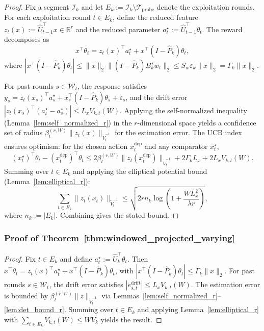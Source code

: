\documentclass{article}
\newcommand{\R}{\mathbb{R}}
\newcommand{\cI}{\mathcal{I}}
\newcommand{\cTprobe}{\mathcal{T}_{\mathrm{probe}}}
\begin{document}
\begin{proof}
Fix a segment $\cI_k$ and let $E_k := \cI_k \setminus \cTprobe$ denote the exploitation rounds.
For each exploitation round $t \in E_k$, define the reduced feature $z_t(x) := \widehat U_{t-1}^\top x \in \R^r$ and the reduced parameter $a_t^\star := \widehat U_{t-1}^\top \theta_t$.
The reward decomposes as
\[
x^\top \theta_t = z_t(x)^\top a_t^\star + x^\top (I - \widehat P_k)\theta_t,
\]
where $|x^\top (I - \widehat P_k)\theta_t| \le \|x\|_2 \|(I - \widehat P_k) B_k^\star w_t\|_2 \le S_w \varepsilon_k \|x\|_2 = \Gamma_k \|x\|_2$.

For past rounds $s \in \mathcal{W}_t$, the response satisfies $y_s = z_t(x_s)^\top a_s^\star + x_s^\top(I - \widehat P_k)\theta_s + \varepsilon_s$, and the drift error $|z_t(x_s)^\top(a_t^\star - a_s^\star)| \le L_x V_{k,t}(W)$.
Applying the self-normalized inequality (Lemma~\ref{lem:self_normalized_r}) in the $r$-dimensional space yields a confidence set of radius $\beta_t^{(r,W)} \|z_t(x)\|_{\widetilde V_t^{-1}}$ for the estimation error.
The UCB index ensures optimism: for the chosen action $x_t^{\mathrm{dep}}$ and any comparator $x^\star_t$,
\[
(x^\star_t)^\top \theta_t - (x_t^{\mathrm{dep}})^\top \theta_t \le 2\beta_t^{(r,W)} \|z_t(x_t^{\mathrm{dep}})\|_{\widetilde V_t^{-1}} + 2\Gamma_k L_x + 2L_x V_{k,t}(W).
\]
Summing over $t \in E_k$ and applying the elliptical potential bound (Lemma~\ref{lem:elliptical_r}):
\[
\sum_{t \in E_k} \|z_t(x_t)\|_{\widetilde V_t^{-1}} \le \sqrt{2r n_k \log\!\left(1 + \frac{W L_x^2}{\lambda r}\right)},
\]
where $n_k := |E_k|$.
Combining gives the stated bound.
\end{proof}

\subsubsection{Proof of Theorem~\ref{thm:windowed_projected_varying}}
\label{proof:windowed_projected_varying}

\begin{proof}
Fix $t\in E_k$ and define $a_t^\star := \widehat U_k^\top \theta_t$.
Then $x^\top \theta_t = z_t(x)^\top a_t^\star + x^\top(I-\widehat P_k)\theta_t$, with $|x^\top(I-\widehat P_k)\theta_t| \le \Gamma_k\|x\|_2$.
For past rounds $s\in\mathcal W_t$, the drift error satisfies $|e_{s,t}^{\mathrm{drift}}| \le L_xV_{k,t}(W)$.
The estimation error is bounded by $\beta_t^{(r,W)}\|z\|_{\widetilde V_t^{-1}}$ via Lemmas~\ref{lem:self_normalized_r}--\ref{lem:det_bound_r}.
Summing over $t\in E_k$ and applying Lemma~\ref{lem:elliptical_r} with $\sum_{t\in E_k} V_{k,t}(W) \le W V_k$ yields the result.
\end{proof}
\end{document}
